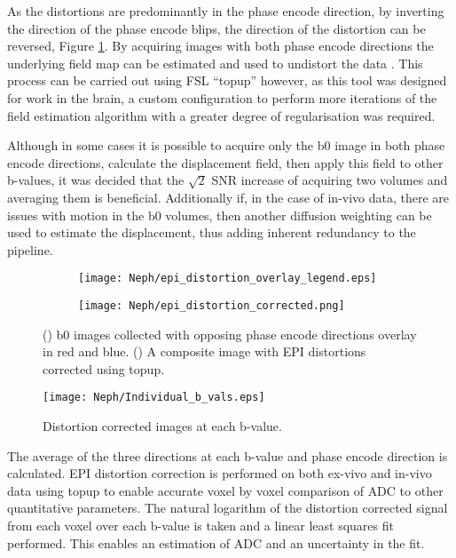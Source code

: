 As the distortions are predominantly in the phase encode direction, by inverting the direction of the phase encode blips, the direction of the distortion can be reversed, Figure \ref{fig:ex_epi_distortion_overlay}. By acquiring images with both phase encode directions the underlying field map can be estimated and used to undistort the data \cite{andersson_how_2003}. This process can be carried out using \ac{FSL} ``topup'' however, as this tool was designed for work in the brain, a custom configuration to perform more iterations of the field estimation algorithm with a greater degree of regularisation was required. 

Although in some cases it is possible to acquire only the b0 image in both phase encode directions, calculate the displacement field, then apply this field to other b-values, it was decided that the $\sqrt{2}$ \ac{SNR} increase of acquiring two volumes and averaging them is beneficial. Additionally if, in the case of in-vivo data, there are issues with motion in the b0 volumes, then another diffusion weighting can be used to estimate the displacement, thus adding inherent redundancy to the pipeline.

\begin{figure}[H]
	\centering
	\begin{subfigure}[c]{0.47\textwidth}
		\centering
		\texttt{[image: Neph/epi\_distortion\_overlay\_legend.eps]}
		\caption{}
		\label{fig:ex_epi_distortion_overlay}
	\end{subfigure}
	\hfill
	\begin{subfigure}[c]{0.47\textwidth}
		\centering
		\texttt{[image: Neph/epi\_distortion\_corrected.png]}
		\caption{}
		\label{fig:ex_epi_distortion_corrected}
	\end{subfigure}
	\caption{() b0 images collected with opposing phase encode directions overlay in red and blue. () A composite image with \ac{EPI} distortions corrected using topup.}
	\label{fig:ex_epi_distortion}
\end{figure}

\begin{figure}[H]
	\centering
	\texttt{[image: Neph/Individual\_b\_vals.eps]}
	\caption{Distortion corrected images at each b-value.}
	\label{fig:ex_adc_raw_data}	
\end{figure}

The average of the three directions at each b-value and phase encode direction is calculated. \ac{EPI} distortion correction is performed on both ex-vivo and in-vivo data using topup to enable accurate voxel by voxel comparison of \ac{ADC} to other quantitative parameters. The natural logarithm of the distortion corrected signal from each voxel over each b-value is taken and a linear least squares fit performed. This enables an estimation of \ac{ADC} and an uncertainty in the fit. 

